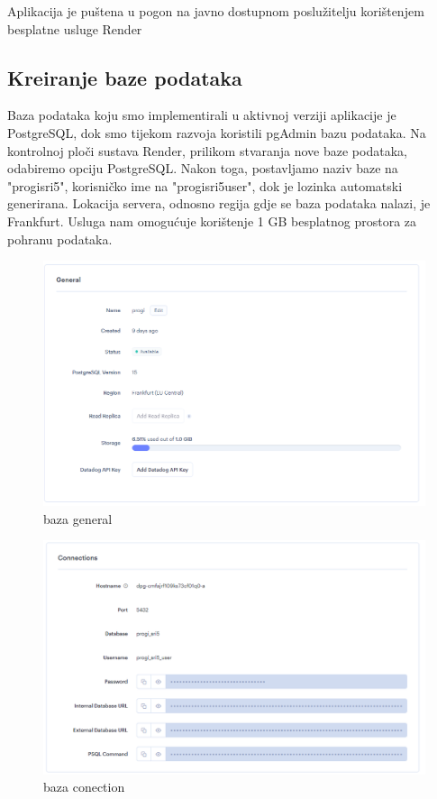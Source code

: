 			 \textit{}Aplikacija je puštena u pogon na javno dostupnom poslužitelju korištenjem besplatne usluge Render
			 
			 \subsection{Kreiranje baze podataka}
			 
			 	\text{} Baza podataka koju smo implementirali u aktivnoj verziji aplikacije je PostgreSQL, dok smo tijekom razvoja koristili pgAdmin bazu podataka. Na kontrolnoj ploči sustava Render, prilikom stvaranja nove baze podataka, odabiremo opciju PostgreSQL. Nakon toga, postavljamo naziv baze na "progi\textunderscore sri5", korisničko ime na "progi\textunderscore sri5\textunderscore user", dok je lozinka automatski generirana. Lokacija servera, odnosno regija gdje se baza podataka nalazi, je Frankfurt. Usluga nam omogućuje korištenje 1 GB besplatnog prostora za pohranu podataka.\\
			 	
			 	
				\begin{figure}[htb]
					\centering
					\includegraphics[width=15cm]{slike/baza_1.png}
					\caption{baza general}
					\label{fig:fer-logo}
				\end{figure}
				\newpage
				\begin{figure}[htb]
					\centering
					\includegraphics[width=15cm]{slike/baza_2.png}
					\caption{baza conection}
					\label{fig:fer-logo}
				\end{figure}
				
